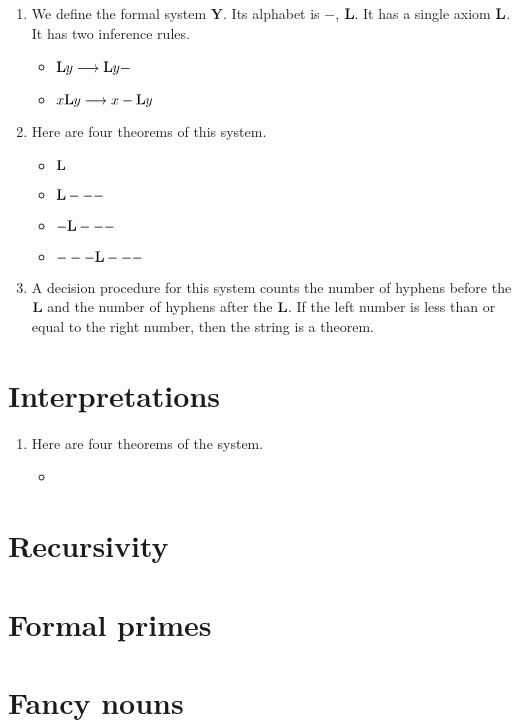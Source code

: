 \documentclass[11pt,letterpaper]{article}
\begin{document}
\begin{enumerate}
    \newcommand{\ysys}{\mathbf{Y}}
  \item
    We define the formal system $\ysys$.
    \newcommand{\L}{\mathqd{L}}
    Its alphabet is $-$, $\L$.
    It has a single axiom $\L$.
    It has two inference rules.
    \begin{itemize}
      \item
        $\L y \rewrite \L y-$
      \item
        $x \L y \rewrite x-\L y$
    \end{itemize}

  \item
    Here are four theorems of this system.
    \begin{itemize}
      \item $\L$
      \item $\L---$
      \item $-\L---$
      \item $---\L---$
    \end{itemize}

  \item
    A decision procedure for this system counts the number of hyphens before
    the $\L$ and the number of hyphens after the $\L$. If the left number is
    less than or equal to the right number, then the string is a theorem.
\end{enumerate}

\section{Interpretations}

\begin{enumerate}
  \item
    Here are four theorems of the system.
    \begin{itemize}
      \item
    \end{itemize}
\end{enumerate}

\section{Recursivity}

\section{Formal primes}

\section{Fancy nouns}
\end{document}
